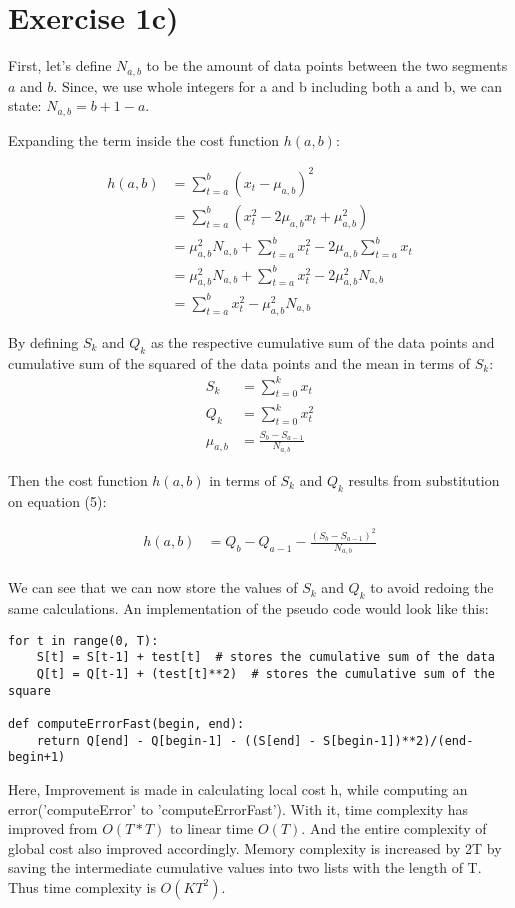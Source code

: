 \section*{Exercise 1c)} %
\label{sec:Exercise 1c)}

First, let's define $N_{a,b}$ to be the amount of data points between the two segments $a$ and $b$. Since, we use whole integers for a and b including both a and b, we can state: $N_{a,b} = b+1 - a$.

Expanding the term inside the cost function $h(a,b)$:

\begin{align} 
    h(a,b) &= \sum_{t=a}^{b}(x_t-\mu_{a,b})^2 \\
           &= \sum_{t=a}^{b}(x_t^2-2\mu_{a,b}x_t+\mu_{a,b}^2) \\
           &= \mu_{a,b}^2N_{a,b} + \sum_{t=a}^{b}x_t^2 -2\mu_{a,b}\sum_{t=a}^{b}x_t \\
           &= \mu_{a,b}^2N_{a,b} + \sum_{t=a}^{b}x_t^2 -2\mu_{a,b}^2N_{a,b} \\
           &= \sum_{t=a}^{b}x_t^2 -\mu_{a,b}^2N_{a,b} 
\end{align} 

By defining $S_k$ and $Q_k$ as the respective cumulative sum of the data points and cumulative sum of the squared of the data points and the mean in terms of $S_k$:
\begin{align} 
    S_k &= \sum_{t=0}^{k}x_t \\
    Q_k &= \sum_{t=0}^{k}x_t^2 \\
    \mu_{a,b} &= \frac{S_b - S_{a-1}}{N_{a,b}}
\end{align} 

Then the cost function $h(a,b)$ in terms of $S_k$ and $Q_k$ results from substitution on equation (5):

\begin{align} 
    h(a,b) &= Q_b - Q_{a-1} -\frac{(S_b - S_{a-1})^2}{N_{a,b}} \\
\end{align} 

We can see that we can now store the values of $S_k$ and $Q_k$ to avoid redoing the same calculations.
An implementation of the pseudo code would look like this: 
\begin{lstlisting}
for t in range(0, T):
    S[t] = S[t-1] + test[t]  # stores the cumulative sum of the data
    Q[t] = Q[t-1] + (test[t]**2)  # stores the cumulative sum of the square

def computeErrorFast(begin, end):
    return Q[end] - Q[begin-1] - ((S[end] - S[begin-1])**2)/(end-begin+1)
\end{lstlisting}

Here, Improvement is made in calculating local cost h, while computing an error('computeError' to 'computeErrorFast').
With it, time complexity has improved from $O(T*T)$ to linear time $O(T)$. And the entire complexity of global cost also improved accordingly. 
Memory complexity is increased by 2T by saving the intermediate cumulative values into two lists with the length of T. Thus time complexity is $O(KT^2)$. \\ 

